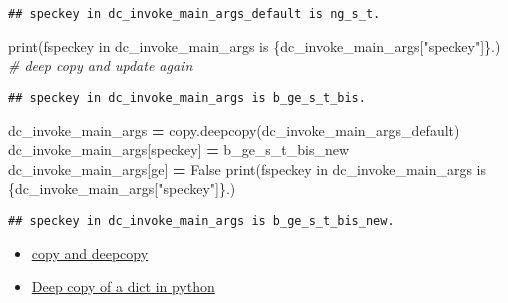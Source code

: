 \documentclass[
]{book}
\newenvironment{Shaded}{\begin{snugshade}}{\end{snugshade}}
\newcommand{\BuiltInTok}[1]{#1}
\newcommand{\CommentTok}[1]{\textcolor[rgb]{0.56,0.35,0.01}{\textit{#1}}}
\newcommand{\NormalTok}[1]{#1}
\newcommand{\OperatorTok}[1]{\textcolor[rgb]{0.81,0.36,0.00}{\textbf{#1}}}
\newcommand{\SpecialCharTok}[1]{\textcolor[rgb]{0.00,0.00,0.00}{#1}}
\newcommand{\SpecialStringTok}[1]{\textcolor[rgb]{0.31,0.60,0.02}{#1}}
\newcommand{\StringTok}[1]{\textcolor[rgb]{0.31,0.60,0.02}{#1}}
\newcommand{\VariableTok}[1]{\textcolor[rgb]{0.00,0.00,0.00}{#1}}
\providecommand{\tightlist}{%
  \setlength{\itemsep}{0pt}\setlength{\parskip}{0pt}}
\begin{document}
\begin{verbatim}
## speckey in dc_invoke_main_args_default is ng_s_t.
\end{verbatim}

\begin{Shaded}
\begin{Highlighting}[]
\BuiltInTok{print}\NormalTok{(}\SpecialStringTok{f\textquotesingle{}speckey in dc\_invoke\_main\_args is }\SpecialCharTok{\{}\NormalTok{dc\_invoke\_main\_args[}\StringTok{"speckey"}\NormalTok{]}\SpecialCharTok{\}}\SpecialStringTok{.\textquotesingle{}}\NormalTok{)}
\CommentTok{\# deep copy and update again}
\end{Highlighting}
\end{Shaded}

\begin{verbatim}
## speckey in dc_invoke_main_args is b_ge_s_t_bis.
\end{verbatim}

\begin{Shaded}
\begin{Highlighting}[]
\NormalTok{dc\_invoke\_main\_args }\OperatorTok{=}\NormalTok{ copy.deepcopy(dc\_invoke\_main\_args\_default)}
\NormalTok{dc\_invoke\_main\_args[}\StringTok{\textquotesingle{}speckey\textquotesingle{}}\NormalTok{] }\OperatorTok{=} \StringTok{\textquotesingle{}b\_ge\_s\_t\_bis\_new\textquotesingle{}}
\NormalTok{dc\_invoke\_main\_args[}\StringTok{\textquotesingle{}ge\textquotesingle{}}\NormalTok{] }\OperatorTok{=} \VariableTok{False}
\BuiltInTok{print}\NormalTok{(}\SpecialStringTok{f\textquotesingle{}speckey in dc\_invoke\_main\_args is }\SpecialCharTok{\{}\NormalTok{dc\_invoke\_main\_args[}\StringTok{"speckey"}\NormalTok{]}\SpecialCharTok{\}}\SpecialStringTok{.\textquotesingle{}}\NormalTok{)}
\end{Highlighting}
\end{Shaded}

\begin{verbatim}
## speckey in dc_invoke_main_args is b_ge_s_t_bis_new.
\end{verbatim}

\begin{itemize}
\tightlist
\item
  \href{https://docs.python.org/2/library/copy.html}{copy and deepcopy}
\item
  \href{https://stackoverflow.com/questions/5105517/deep-copy-of-a-dict-in-python}{Deep copy of a dict in python}
\end{itemize}
\end{document}
